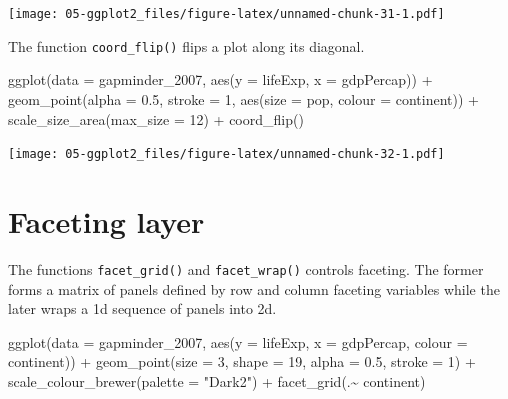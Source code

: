 \documentclass[
]{book}
\newenvironment{Shaded}{\begin{snugshade}}{\end{snugshade}}
\newcommand{\AttributeTok}[1]{\textcolor[rgb]{0.77,0.63,0.00}{#1}}
\newcommand{\DecValTok}[1]{\textcolor[rgb]{0.00,0.00,0.81}{#1}}
\newcommand{\FloatTok}[1]{\textcolor[rgb]{0.00,0.00,0.81}{#1}}
\newcommand{\FunctionTok}[1]{\textcolor[rgb]{0.00,0.00,0.00}{#1}}
\newcommand{\NormalTok}[1]{#1}
\newcommand{\SpecialCharTok}[1]{\textcolor[rgb]{0.00,0.00,0.00}{#1}}
\newcommand{\StringTok}[1]{\textcolor[rgb]{0.31,0.60,0.02}{#1}}
\begin{document}
\texttt{[image: 05-ggplot2\_files/figure-latex/unnamed-chunk-31-1.pdf]}

The function \texttt{coord\_flip()} flips a plot along its diagonal.

\begin{Shaded}
\begin{Highlighting}[]
\FunctionTok{ggplot}\NormalTok{(}\AttributeTok{data =}\NormalTok{ gapminder\_2007, }\FunctionTok{aes}\NormalTok{(}\AttributeTok{y =}\NormalTok{ lifeExp, }\AttributeTok{x =}\NormalTok{ gdpPercap)) }\SpecialCharTok{+} 
  \FunctionTok{geom\_point}\NormalTok{(}\AttributeTok{alpha =} \FloatTok{0.5}\NormalTok{, }\AttributeTok{stroke =} \DecValTok{1}\NormalTok{, }\FunctionTok{aes}\NormalTok{(}\AttributeTok{size =}\NormalTok{ pop, }\AttributeTok{colour =}\NormalTok{ continent)) }\SpecialCharTok{+}
  \FunctionTok{scale\_size\_area}\NormalTok{(}\AttributeTok{max\_size =} \DecValTok{12}\NormalTok{) }\SpecialCharTok{+}
  \FunctionTok{coord\_flip}\NormalTok{()}
\end{Highlighting}
\end{Shaded}

\texttt{[image: 05-ggplot2\_files/figure-latex/unnamed-chunk-32-1.pdf]}

\hypertarget{faceting-layer}{%
\section{Faceting layer}\label{faceting-layer}}

The functions \texttt{facet\_grid()} and \texttt{facet\_wrap()} controls faceting. The former forms a matrix of panels defined by row and column faceting variables while the later wraps a 1d sequence of panels into 2d.

\begin{Shaded}
\begin{Highlighting}[]
\FunctionTok{ggplot}\NormalTok{(}\AttributeTok{data =}\NormalTok{ gapminder\_2007, }\FunctionTok{aes}\NormalTok{(}\AttributeTok{y =}\NormalTok{ lifeExp, }\AttributeTok{x =}\NormalTok{ gdpPercap, }\AttributeTok{colour =}\NormalTok{ continent)) }\SpecialCharTok{+} 
  \FunctionTok{geom\_point}\NormalTok{(}\AttributeTok{size =} \DecValTok{3}\NormalTok{, }\AttributeTok{shape =} \DecValTok{19}\NormalTok{, }\AttributeTok{alpha =} \FloatTok{0.5}\NormalTok{, }\AttributeTok{stroke =} \DecValTok{1}\NormalTok{) }\SpecialCharTok{+}
  \FunctionTok{scale\_colour\_brewer}\NormalTok{(}\AttributeTok{palette =} \StringTok{"Dark2"}\NormalTok{) }\SpecialCharTok{+}
  \FunctionTok{facet\_grid}\NormalTok{(.}\SpecialCharTok{\textasciitilde{}}\NormalTok{ continent)}
\end{Highlighting}
\end{Shaded}
\end{document}
